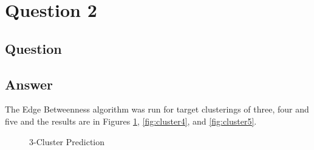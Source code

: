 \section{Question 2}

\subsection{Question}


\subsection{Answer}
The Edge Betweenness algorithm was run for target clusterings of three, four and five and the results are in Figures \ref{fig:cluster3}, \ref{fig:cluster4}, and \ref{fig:cluster5}.

\begin{figure}[h!]
\centering
{}
\caption{3-Cluster Prediction}
\label{fig:cluster3}
\end{figure}

